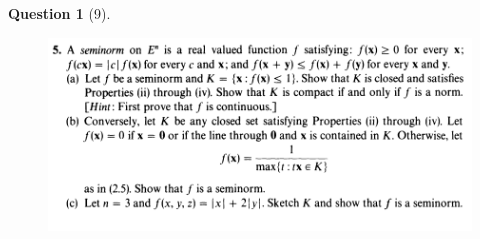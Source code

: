 \documentclass{article} %
\theoremstyle{quest}
\newtheorem*{question}{Question}
\begin{document}
\newpage

\begin{question}[9]
\hfill
\begin{figure}[h!]
  \centering
    \includegraphics[width=1\textwidth]{MA-2-211-5.png}
\end{figure}
\end{question}
\end{document}
